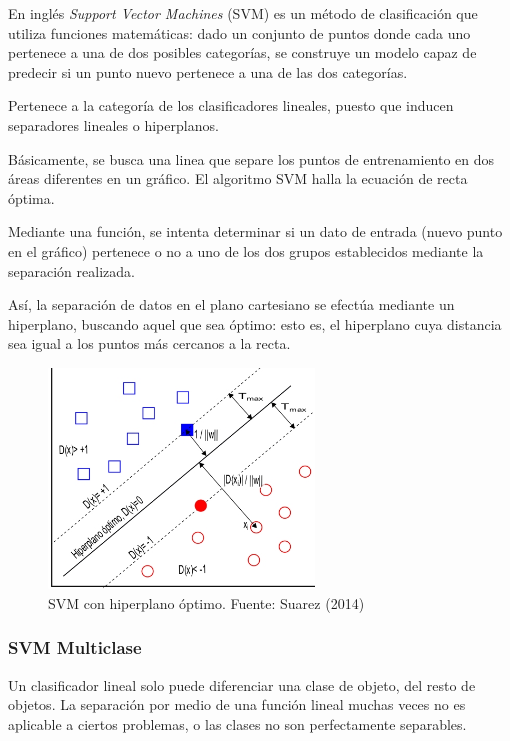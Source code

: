 \documentclass[a4paper,12pt,oneside,spanish]{book}
\begin{document}
En inglés \textit{Support Vector Machines} (SVM) es un método de clasificación que utiliza funciones matemáticas: dado un conjunto de puntos donde cada uno pertenece a una de dos posibles categorías, se construye un modelo capaz de predecir si un punto nuevo pertenece a una de las dos categorías.  \par

Pertenece a la categoría de los clasificadores lineales, puesto que inducen separadores lineales o hiperplanos. \par

Básicamente, se busca una linea que separe los puntos de entrenamiento en dos áreas diferentes en un gráfico. El algoritmo SVM halla la ecuación de recta óptima.\par

Mediante una función, se intenta determinar si un dato de entrada (nuevo punto en el gráfico) pertenece o no a uno de los dos grupos establecidos mediante la separación realizada. \par

Así, la separación de datos en el plano cartesiano se efectúa mediante un hiperplano, buscando aquel que sea óptimo: esto es, el hiperplano cuya distancia sea igual a los puntos más cercanos a la recta.\par

\begin{figure}[h!]
	\includegraphics[width=200pt]{Imagenes/svm1.jpg}
	\centering
	\caption{SVM con hiperplano óptimo. Fuente: Suarez (2014) }
	\label{fig:svm1}
\end{figure}

\subsubsection{SVM Multiclase}
Un clasificador lineal solo puede diferenciar una clase de objeto, del resto de objetos. La separación por medio de una función lineal muchas veces no es aplicable a ciertos problemas, o las clases no son perfectamente separables. \par
\end{document}
